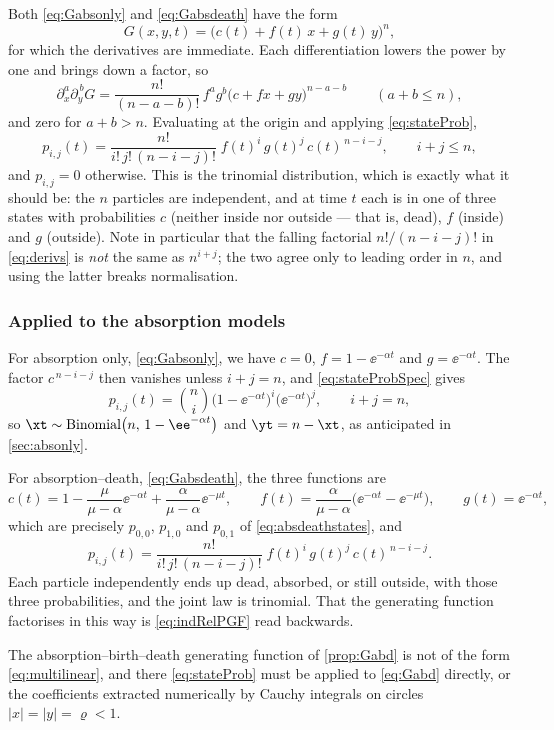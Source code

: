 Both \cref{eq:Gabsonly} and \cref{eq:Gabsdeath} have the form
\begin{equation}
\label{eq:multilinear}
G(x,y,t) = \bigl(c(t) + f(t)\,x + g(t)\,y\bigr)^n ,
\end{equation}
for which the derivatives are immediate. Each differentiation lowers the power by one and
brings down a factor, so
\begin{equation}
\label{eq:derivs}
\partial_x^{a}\partial_y^{\,b}G
= \frac{n!}{(n-a-b)!}\,f^{a}g^{b}\bigl(c+fx+gy\bigr)^{n-a-b}
\qquad (a+b\le n),
\end{equation}
and zero for $a+b>n$. Evaluating at the origin and applying \cref{eq:stateProb},
\begin{equation}
\label{eq:stateProbSpec}
p_{i,j}(t) = \frac{n!}{i!\,j!\,(n-i-j)!}\;f(t)^{i}\,g(t)^{j}\,c(t)^{\,n-i-j},
\qquad i+j\le n,
\end{equation}
and $p_{i,j}=0$ otherwise. This is the trinomial distribution, which is exactly what it
should be: the $n$ particles are independent, and at time $t$ each is in one of three
states with probabilities $c$ (neither inside nor outside --- that is, dead), $f$ (inside)
and $g$ (outside). Note in particular that the falling factorial $n!/(n-i-j)!$ in
\cref{eq:derivs} is \emph{not} the same as $n^{i+j}$; the two agree only to leading order in
$n$, and using the latter breaks normalisation.

\subsubsection*{Applied to the absorption models}

For absorption only, \cref{eq:Gabsonly}, we have $c=0$, $f=1-\ee^{-\alpha t}$ and
$g=\ee^{-\alpha t}$. The factor $c^{\,n-i-j}$ then vanishes unless $i+j=n$, and
\cref{eq:stateProbSpec} gives
\begin{equation*}
p_{i,j}(t) = \binom{n}{i}\bigl(1-\ee^{-\alpha t}\bigr)^{i}\bigl(\ee^{-\alpha t}\bigr)^{j},
\qquad i+j=n,
\end{equation*}
so $\xt\sim\text{Binomial}\bigl(n,\,1-\ee^{-\alpha t}\bigr)$ and $\yt = n-\xt$, as
anticipated in \cref{sec:absonly}.

For absorption--death, \cref{eq:Gabsdeath}, the three functions are
\begin{equation*}
c(t) = 1-\frac{\mu}{\mu-\alpha}\ee^{-\alpha t} + \frac{\alpha}{\mu-\alpha}\ee^{-\mu t},
\qquad
f(t) = \frac{\alpha}{\mu-\alpha}\bigl(\ee^{-\alpha t}-\ee^{-\mu t}\bigr),
\qquad
g(t) = \ee^{-\alpha t},
\end{equation*}
which are precisely $p_{0,0}$, $p_{1,0}$ and $p_{0,1}$ of \cref{eq:absdeathstates}, and
\begin{equation*}
p_{i,j}(t) = \frac{n!}{i!\,j!\,(n-i-j)!}\;f(t)^{i}\,g(t)^{j}\,c(t)^{\,n-i-j}.
\end{equation*}
Each particle independently ends up dead, absorbed, or still outside, with those three
probabilities, and the joint law is trinomial. That the generating function factorises in
this way is \cref{eq:indRelPGF} read backwards.

The absorption--birth--death generating function of \cref{prop:Gabd} is not of the form
\cref{eq:multilinear}, and there \cref{eq:stateProb} must be applied to \cref{eq:Gabd}
directly, or the coefficients extracted numerically by Cauchy integrals on circles
$|x|=|y|=\varrho<1$.
